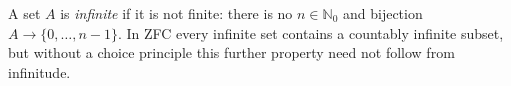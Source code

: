 
A set $A$ is \emph{infinite} if it is not finite: there is no $n\in\mathbb N_0$ and bijection $A\to\{0,\ldots,n-1\}$. In ZFC every infinite set contains a countably infinite subset, but without a choice principle this further property need not follow from infinitude.
